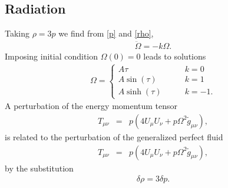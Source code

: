 \documentclass[10pt,letterpaper]{article}
\numberwithin{equation}{section}
\begin{document}
\subsection{Radiation}
Taking $\rho = 3p$ we find from \eqref{p} and \eqref{rho},
\begin{eqnarray}
\ddot\Omega = -k\Omega.
\end{eqnarray}
Imposing initial condition $\Omega(0)=0$ leads to solutions
\begin{eqnarray}
\Omega = 
\begin{cases}
A\tau &\qquad k=0 \\
A\sin(\tau)&\qquad k=1\\
A\sinh(\tau)&\qquad k=-1.
\end{cases}
\end{eqnarray}
A perturbation of the energy momentum tensor
\begin{eqnarray}
T_{\mu\nu} &=& p(4U_\mu U_\nu + p\Omega^2\tilde g_{\mu\nu}),
\end{eqnarray}
is related to the perturbation of the generalized perfect fluid
\begin{eqnarray}
T_{\mu\nu} &=& p(4U_\mu U_\nu + p\Omega^2\tilde g_{\mu\nu}),
\end{eqnarray}
by the substitution 
\begin{eqnarray}
\delta\rho = 3\delta p.
\end{eqnarray}
%
%
\end{document}
